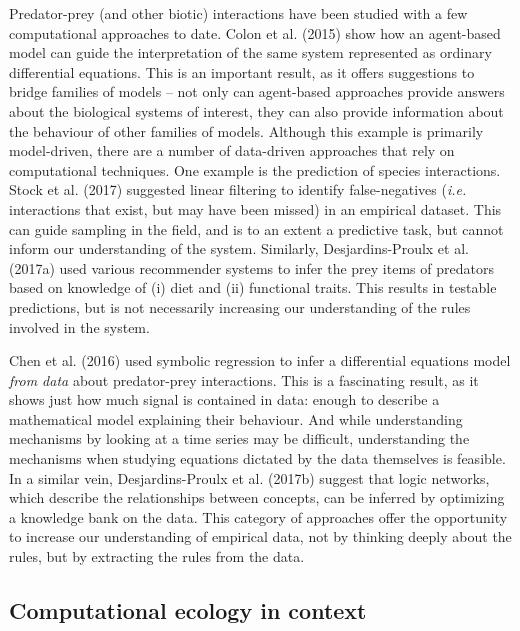 \documentclass[12pt]{article}
\begin{document}
Predator-prey (and other biotic) interactions have been studied with a
few computational approaches to date. Colon et al. (2015) show how an
agent-based model can guide the interpretation of the same system
represented as ordinary differential equations. This is an important
result, as it offers suggestions to bridge families of models -- not
only can agent-based approaches provide answers about the biological
systems of interest, they can also provide information about the
behaviour of other families of models. Although this example is
primarily model-driven, there are a number of data-driven approaches
that rely on computational techniques. One example is the prediction of
species interactions. Stock et al. (2017) suggested linear filtering to
identify false-negatives (\emph{i.e.} interactions that exist, but may
have been missed) in an empirical dataset. This can guide sampling in
the field, and is to an extent a predictive task, but cannot inform our
understanding of the system. Similarly, Desjardins-Proulx et al. (2017a)
used various recommender systems to infer the prey items of predators
based on knowledge of (i) diet and (ii) functional traits. This results
in testable predictions, but is not necessarily increasing our
understanding of the rules involved in the system.

Chen et al. (2016) used symbolic regression to infer a differential
equations model \emph{from data} about predator-prey interactions. This
is a fascinating result, as it shows just how much signal is contained
in data: enough to describe a mathematical model explaining their
behaviour. And while understanding mechanisms by looking at a time
series may be difficult, understanding the mechanisms when studying
equations dictated by the data themselves is feasible. In a similar
vein, Desjardins-Proulx et al. (2017b) suggest that logic networks,
which describe the relationships between concepts, can be inferred by
optimizing a knowledge bank on the data. This category of approaches
offer the opportunity to increase our understanding of empirical data,
not by thinking deeply about the rules, but by extracting the rules from
the data.

\hypertarget{computational-ecology-in-context}{%
\subsection{Computational ecology in
context}\label{computational-ecology-in-context}}
\end{document}
